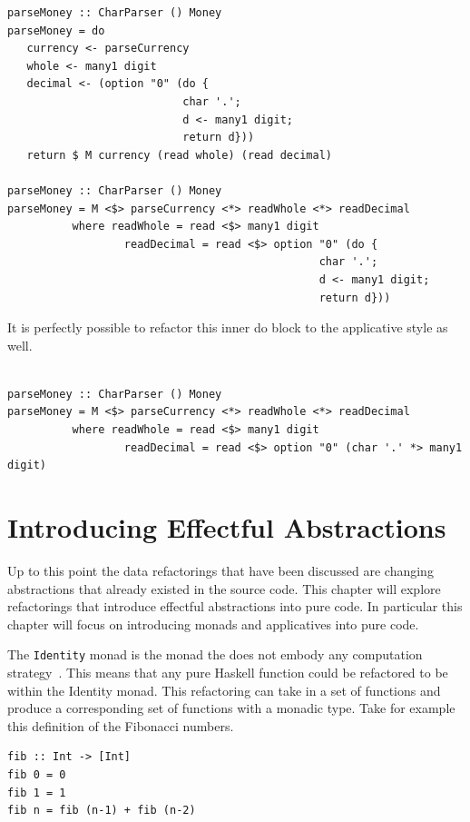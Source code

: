 \begin{lstlisting}[frame=tlrb]
parseMoney :: CharParser () Money
parseMoney = do
   currency <- parseCurrency 
   whole <- many1 digit
   decimal <- (option "0" (do { 
                           char '.';
                           d <- many1 digit;
                           return d}))
   return $ M currency (read whole) (read decimal)
   
parseMoney :: CharParser () Money
parseMoney = M <$> parseCurrency <*> readWhole <*> readDecimal
          where readWhole = read <$> many1 digit
                  readDecimal = read <$> option "0" (do { 
                           						char '.';
                          						d <- many1 digit;
                           						return d}))
\end{lstlisting}

It is perfectly possible to refactor this inner do block to the applicative style as well.

\begin{lstlisting}[frame=tblr]

parseMoney :: CharParser () Money
parseMoney = M <$> parseCurrency <*> readWhole <*> readDecimal
          where readWhole = read <$> many1 digit
                  readDecimal = read <$> option "0" (char '.' *> many1 digit)
\end{lstlisting}


\chapter{Introducing Effectful Abstractions}
Up to this point the data refactorings that have been discussed are changing abstractions that already existed in the source code. This chapter will explore refactorings that introduce effectful abstractions into pure code. In particular this chapter will focus on introducing monads and applicatives into pure code.

The \texttt{Identity} monad is the monad the does not embody any computation strategy~\citep{identityMonad}. This means that any pure Haskell function could be refactored to be within the Identity monad. This refactoring can take in a set of functions and produce a corresponding set of functions with a monadic type. Take for example this definition of the Fibonacci numbers.

\begin{lstlisting}[frame=tblr]
fib :: Int -> [Int]
fib 0 = 0
fib 1 = 1
fib n = fib (n-1) + fib (n-2)
\end{lstlisting} 

